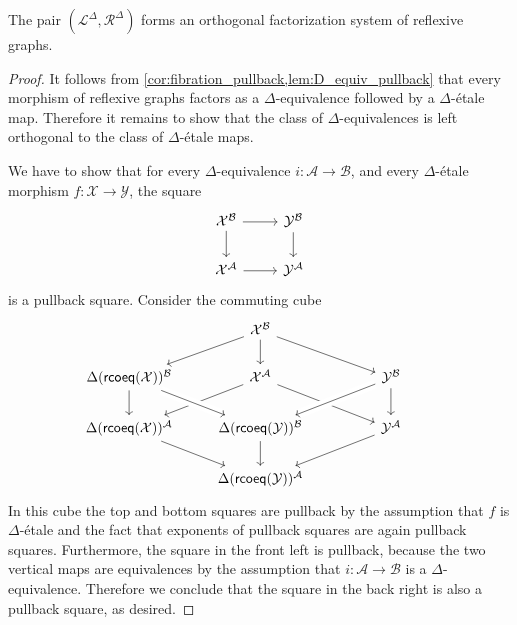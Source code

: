 \begin{thm}\label{thm:modal_rofs}
The pair $(\mathcal{L}^\Delta,\mathcal{R}^\Delta)$ forms an orthogonal factorization system of reflexive graphs.
\end{thm}

\begin{proof}
It follows from \cref{cor:fibration_pullback,lem:D_equiv_pullback} that every morphism of reflexive graphs factors as a $\Delta$-equivalence followed by a $\Delta$-\'etale map. Therefore it remains to show that the class of $\Delta$-equivalences is left orthogonal to the class of $\Delta$-\'etale maps.

We have to show that for every $\Delta$-equivalence $i:\mathcal{A}\to\mathcal{B}$, and every $\Delta$-\'etale morphism $f:\mathcal{X}\to\mathcal{Y}$, the square
\begin{equation*}
\begin{tikzcd}
\mathcal{X}^{\mathcal{B}} \arrow[r] \arrow[d] & \mathcal{Y}^{\mathcal{B}} \arrow[d] \\
\mathcal{X}^{\mathcal{A}} \arrow[r] & \mathcal{Y}^{\mathcal{A}}
\end{tikzcd}
\end{equation*}
is a pullback square. Consider the commuting cube
\begin{equation*}
\begin{tikzcd}
& \mathcal{X}^{\mathcal{B}} \arrow[dl] \arrow[d] \arrow[dr] \\
\Delta(\rcoeq(\mathcal{X}))^{\mathcal{B}} \arrow[d] & \mathcal{X}^{\mathcal{A}} \arrow[dl] \arrow[dr] & \mathcal{Y}^{\mathcal{B}} \arrow[d] \arrow[dl,crossing over] \\
\Delta(\rcoeq(\mathcal{X}))^{\mathcal{A}} \arrow[dr] & \Delta(\rcoeq(\mathcal{Y}))^{\mathcal{B}} \arrow[from=ul,crossing over] \arrow[d] & \mathcal{Y}^{\mathcal{A}} \arrow[dl] \\
& \Delta(\rcoeq(\mathcal{Y}))^{\mathcal{A}} & \phantom{\Delta(\rcoeq(\mathcal{X}))^{\mathcal{B}}}
\end{tikzcd}
\end{equation*}
In this cube the top and bottom squares are pullback by the assumption that $f$ is $\Delta$-\'etale and the fact that exponents of pullback squares are again pullback squares. Furthermore, the square in the front left is pullback, because the two vertical maps are equivalences by the assumption that $i:\mathcal{A}\to\mathcal{B}$ is a $\Delta$-equivalence. Therefore we conclude that the square in the back right is also a pullback square, as desired.
\end{proof}

